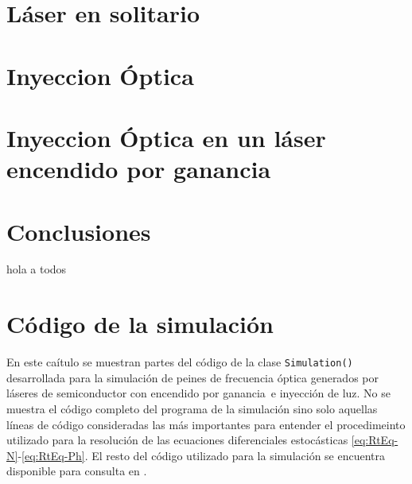 \documentclass[a4paper, 11pt, oneside]{book}
\newcommand{\gs}{encendido por ganancia}
\begin{document}
				

			\chapter{Láser en solitario}
				\label{Sol}

					

			\chapter{Inyeccion Óptica}

				

			\chapter{Inyeccion Óptica en un láser \gs}

				

			\chapter{Conclusiones}

				hola a todos


			
			

				
			\newpage
			\appendix

				\chapter{Código de la simulación}
					\label{App:Code}

					En este ca\'itulo se muestran partes del c\'odigo de la clase \texttt{Simulation()} desarrollada para la simulaci\'on de peines de frecuencia \'optica generados por l\'aseres de semiconductor con \gs\ e inyecci\'on de luz. No se muestra el c\'odigo completo del programa de la simulaci\'on sino solo aquellas l\'ineas de c\'odigo consideradas las m\'as importantes para entender el procedimeinto utilizado para la resoluci\'on de las ecuaciones diferenciales estoc\'asticas \ref{eq:RtEq-N}-\ref{eq:RtEq-Ph}. El resto del c\'odigo utilizado para la simulaci\'on se encuentra disponible para consulta en \cite{github}.
					
					

	
\end{document}
